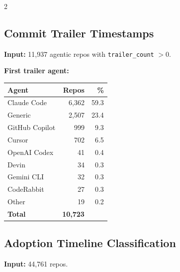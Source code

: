 \documentclass[10pt,a4paper]{article}
\begin{document}
\begin{multicols}{2}
\columnbreak

\subsection*{Commit Trailer Timestamps}
\textbf{Input:} 11,937 agentic repos with \texttt{trailer\_count} $> 0$.\\

\vspace{3pt}

\textbf{First trailer agent:}

\vspace{2pt}
\begin{tabular}{@{}lrr@{}}
\toprule
Agent & Repos & \% \\
\midrule
Claude Code     & 6,362 & 59.3 \\
Generic         & 2,507 & 23.4 \\
GitHub Copilot  &   999 &  9.3 \\
Cursor          &   702 &  6.5 \\
OpenAI Codex    &    41 &  0.4 \\
Devin           &    34 &  0.3 \\
Gemini CLI      &    32 &  0.3 \\
CodeRabbit      &    27 &  0.3 \\
Other           &    19 &  0.2 \\
\midrule
\textbf{Total}  & \textbf{10,723} & \\
\bottomrule
\end{tabular}

\vspace{3pt}


\end{multicols}

\vspace{4pt}
\subsection*{Adoption Timeline Classification}
\textbf{Input:} 44,761 repos.\\
\end{document}
